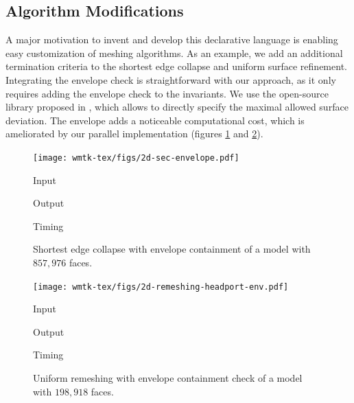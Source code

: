 \subsection{Algorithm Modifications}

A major motivation to invent and develop this declarative language is enabling easy customization of meshing algorithms. As an example, we add an additional termination criteria to the shortest edge collapse and uniform surface refinement.  Integrating the envelope check is straightforward with our approach, as it only requires adding the envelope check to the invariants. We use the open-source library proposed in \cite{Wang:2020:FE}, which allows to directly specify the maximal allowed surface deviation. The envelope adds a noticeable computational cost, which is ameliorated by our parallel implementation (figures \ref{fig:decimate_envelope} and \ref{fig:uniform_envelope}). 

\begin{figure}
    \centering\footnotesize
    \texttt{[image: wmtk-tex/figs/2d-sec-envelope.pdf]}
    \parbox{.3\linewidth}{\centering Input}\hfill
    \parbox{.3\linewidth}{\centering Output}\hfill
    \parbox{.3\linewidth}{\centering Timing}\par
    \caption{Shortest edge collapse with envelope containment of a model with $857,976$ faces. }
    \label{fig:decimate_envelope}
    
    
\end{figure}


\begin{figure}
    \centering\footnotesize
    \texttt{[image: wmtk-tex/figs/2d-remeshing-headport-env.pdf]}
    \parbox{.3\linewidth}{\centering Input}\hfill
    \parbox{.3\linewidth}{\centering Output}\hfill
    \parbox{.3\linewidth}{\centering Timing}\par
    \caption{Uniform remeshing with envelope containment check of a model with $198,918$ faces. }
    \label{fig:uniform_envelope}
    

\end{figure}




